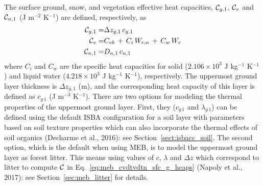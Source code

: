 %
The surface ground, snow,
and vegetation
effective heat capacities, ${\cal C}_{g,1}$, ${\cal C}_v$ and 
${\cal C}_{n,1}$ (J m$^{-2}$ K$^{-1}$)
are defined, respectively, as
%
%
\begin{align}
\label{eq:meb_cvdtvdtn_sfc_g_hcaps}
%
{\cal C}_{g,1} = & 
\Delta z_{g,1}\, c_{g,1}\
%
%
\\
\label{eq:meb_cvdtvdtn_sfc_v_hcaps}
%
{\cal C}_{v} = & C_{vb} \,+\, C_i \, W_{r,n} \,+\, C_w \, W_r
%
\\
\label{eq:meb_cvdtvdtn_sfc_n_hcaps}
%
{\cal C}_{n,1} = & D_{n,1}\,c_{n,1}
\end{align}
%
%
where
$C_i$ and $C_w$ are the specific
heat capacities for solid 
($2.106 \times 10^3$ J kg$^{-1}$ K$^{-1}$) 
and liquid water ($4.218 \times 10^3$ J kg$^{-1}$ K$^{-1}$), respectively.
%
The uppermost ground layer thickness is $\Delta z_{g,1}$ (m),
and the corresponding heat capacity of this layer is defined as
$c_{g\,1}$ (J m$^{-3}$ K$^{-1}$). 
%
%
There are two options for modeling the thermal properties of the
uppermost ground layer.
%
First, they ($c_{g\,1}$ and $\lambda_{g\,1}$)
can be defined using the default ISBA configuration for a soil layer 
with parameters based on soil texture properties
which can also incorporate
the thermal effects of soil organics
(Decharme et al., 2016)\nocite{Decharme16}: see Section~\ref{sect:isbacc_soil}.
%
The second option, 
which is the default when using MEB,
is to model the uppermost ground layer as forest litter.
This means using values of $c$, $\lambda$ and $\Delta z$ 
which correspond to litter to compute ${\cal C}$
in Eq.~\ref{eq:meb_cvdtvdtn_sfc_g_hcaps}
(Napoly et al., 2017)\nocite{napoly_ea_2017}:
see Section~\ref{sec:meb_litter} for details. 
%

